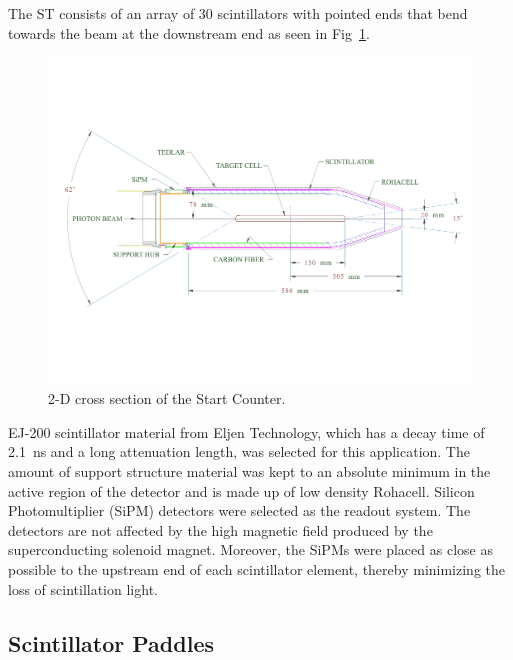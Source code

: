 The ST consists of an array of 30 scintillators with pointed ends that bend towards the beam at the downstream end as seen in Fig~\ref{fig:st2dlabels}. 
	\begin{figure}[!htb]
		\centering
		\includegraphics[width=1.0\columnwidth]{design/figs/st_2d_labels_fig_2.pdf}
		\caption{2-D cross section of the Start Counter.}
		\label{fig:st2dlabels}
	\end{figure}
EJ-200 scintillator material from Eljen Technology\cite{eljen}, which has a decay time of 2.1~ns and a long attenuation length\cite{ej200_specs}, was selected for this application.  The amount of support structure material was kept to an absolute minimum in the active region of the detector and is made up of low density Rohacell\cite{rohacell}. Silicon Photomultiplier (SiPM) detectors were selected as the readout system. The detectors are not affected by the high magnetic field produced by the superconducting solenoid magnet. Moreover, the SiPMs were placed as close as possible to the upstream end of each scintillator element, thereby minimizing the loss of scintillation light\cite{pooser16}.

\subsection{Scintillator Paddles} \label{sec:design_paddles}

